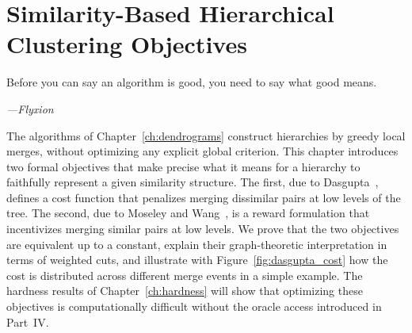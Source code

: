 \chapter{Similarity-Based Hierarchical Clustering Objectives}
\label{ch:objectives}

\epigraph{%
  Before you can say an algorithm is good, you need to say what good means.%
}{\textit{---Flyxion}}

The algorithms of Chapter~\ref{ch:dendrograms} construct hierarchies by greedy local merges, without optimizing any explicit global criterion. This chapter introduces two formal objectives that make precise what it means for a hierarchy to faithfully represent a given similarity structure. The first, due to Dasgupta~\cite{Dasgupta2016}, defines a cost function that penalizes merging dissimilar pairs at low levels of the tree. The second, due to Moseley and Wang~\cite{MoseleyWang2017}, is a reward formulation that incentivizes merging similar pairs at low levels. We prove that the two objectives are equivalent up to a constant, explain their graph-theoretic interpretation in terms of weighted cuts, and illustrate with Figure~\ref{fig:dasgupta_cost} how the cost is distributed across different merge events in a simple example. The hardness results of Chapter~\ref{ch:hardness} will show that optimizing these objectives is computationally difficult without the oracle access introduced in Part~IV.

